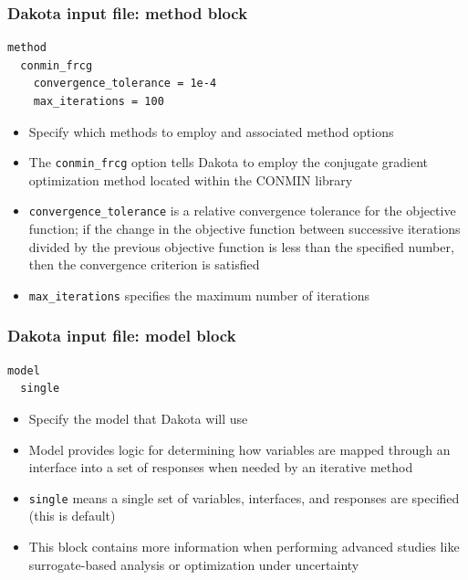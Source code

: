 \documentclass[t]{beamer}
\begin{document}

\begin{frame}[fragile]
  \frametitle{Dakota input file: method block}
  \begin{small}\begin{lstlisting}
method
  conmin_frcg
    convergence_tolerance = 1e-4
    max_iterations = 100\end{lstlisting}\end{small}
  \begin{itemize}
    \item Specify which methods to employ and associated method options
    \item The \lstinline{conmin_frcg} option tells Dakota to employ the
          conjugate gradient optimization method located within the CONMIN
          library
    \item \lstinline{convergence_tolerance} is a relative convergence tolerance
          for the objective function; if the change in the objective function
          between successive iterations divided by the previous objective
          function is less than the specified number, then the convergence
          criterion is satisfied
    \item \lstinline{max_iterations} specifies the maximum number of iterations
  \end{itemize}
\end{frame}


\begin{frame}[fragile]
  \frametitle{Dakota input file: model block}
  \begin{small}\begin{lstlisting}
model
  single\end{lstlisting}\end{small}
  \begin{itemize}
    \item Specify the model that Dakota will use
    \item Model provides logic for determining how variables are mapped through
          an interface into a set of responses when needed by an iterative
          method
    \item \lstinline{single} means a single set of variables, interfaces, and
          responses are specified (this is default)
    \item This block contains more information when performing advanced studies
          like surrogate-based analysis or optimization under uncertainty
  \end{itemize}
\end{frame}
\end{document}

